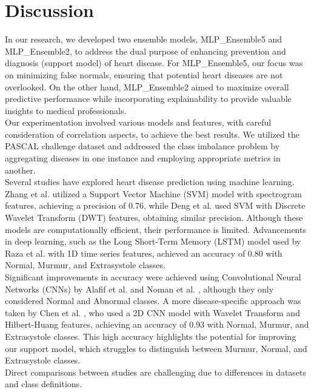 \section{Discussion}

In our research, we developed two ensemble models, MLP\_Ensemble5 and MLP\_Ensemble2, to address the dual purpose of enhancing prevention and diagnosis
(support model) of heart disease. For MLP\_Ensemble5, our focus was on minimizing false normals, ensuring that potential heart diseases are not overlooked.
On the other hand, MLP\_Ensemble2 aimed to maximize overall predictive performance while incorporating explainability
to provide valuable insights to medical professionals.\\
Our experimentation involved various models and features, with careful consideration of correlation aspects,
to achieve the best results. We utilized the PASCAL challenge dataset and addressed the class imbalance problem by aggregating diseases
in one instance and employing appropriate metrics in another.\\
Several studies have explored heart disease prediction using machine learning. Zhang et al. \cite{Zhang_Han_Deng_2017}
utilized a Support Vector Machine (SVM) model with spectrogram features, achieving a precision of 0.76, while Deng et al. \cite{Deng_Han_2016}
used SVM with Discrete Wavelet Transform (DWT) features, obtaining similar precision.
Although these models are computationally efficient, their performance is limited.
Advancements in deep learning, such as the Long Short-Term Memory (LSTM) model used by Raza et al. \cite{Raza_Mehmood_Ullah_Ahmad_Choi_On_2019}
with 1D time series features, achieved an accuracy of 0.80 with Normal, Murmur, and Extrasystole classes.\\
Significant improvements in accuracy were achieved using Convolutional Neural Networks (CNNs)
by Alafif et al. \cite{Alafif_Boulares_Barnawi_Alafif_Althobaiti_Alferaidi_2020} and Noman et al. \cite{Noman_Ting_Salleh_Ombao_2019},
although they only considered Normal and Abnormal classes. A more disease-specific approach was taken
by Chen et al. \cite{Chen_Ren_Hao_Hu_2018}, who used a 2D CNN model with Wavelet Transform and Hilbert-Huang features, achieving an
accuracy of 0.93 with Normal, Murmur, and Extrasystole classes. This high accuracy highlights the potential for
improving our support model, which struggles to distinguish between Murmur, Normal, and Extrasystole classes.\\
Direct comparisons between studies are challenging due to differences in datasets and class definitions.

